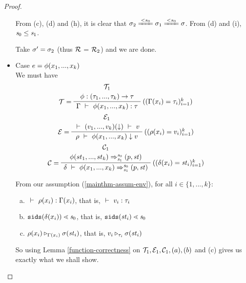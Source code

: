 \begin{proof}
\begin{itemize}
 From (c), (d) and (h), it is clear that $\sgm_2 \ConEq{s_0} \sgm_1 \ConEq{s_0} \sgm$.
 From (d) and (i), $\mathit{s}_0 \le \mathit{s}_1$.
 
 Take $\sigma' = \sigma_2$ (thus $\mathcal{R}$ = $\mathcal{R}_2$)  and we are done. 
 
 
 \item Case $e = \phi(x_1,...,x_k)$ \\
 We must have  
 $$\PT{
 	\UCN{\MT_1}{\Typef {\hcall} {\replc{k}{\tau}} {\tau}}
 	\LeLa{\MT = }
 	\RiLa{((\Gam(x_i)= \tau_i)^k_{i=1})}
 	\UC{\Type{\Gam}{\hcall{\Tupk{x}}}{\tau}}
 }$$
 $$\PT{
 	\UCN{\ME_1}{\Eval{}{\EvalF{\Tupk{v}}}{v}}
 	\LeLa{\ME = }
 	\RiLa{((\rho(x_i)=v_i)^k_{i=1})}
 	\UC{\Eval{\rho}{\hcall{\Tupk{x}}}{v}}
 }$$
 $$\PT{
 	\UCN{\MC_1}{\Transf{\hcall}{\replc{k}{st}}{\s_0}{\s_1}{\sfun{p}{\st}}}
    \LeLa{\MC =}
 	\RiLa{((\del(x_i)=\st_i)^k_{i=1})}
 	\UC{\Trans{\del}{\hcall \Tupk{x}}{\s_0}{\s_1}{\sfun{p}{\st}}}
 }$$
 
 From our assumption (\ref{mainthm-assum-env}), for all $i \in \{1,...,k\}$:
 \begin{enumerate}[(a)]
 	\item $\ \vdash\  \rho(x_i) : \Gamma(x_i)$, that is, $\ \vdash\  v_i : \tau_i$
 	\item $\sids{\del(x_i)} \.< \s_0$, that is, $\sids{\st_i} \.< \s_0$
 	\item $\rho(x_i) \triangleright_{\Gamma(x_i)} \sigma(\mathit{st}_i)$, that is,
 	$v_i \triangleright_{\tau_i} \sigma(\mathit{st}_i)$
 \end{enumerate}
 
 So using Lemma \ref{function-correctness} on $\mathcal{T}_1,\mathcal{E}_1, \mathcal{C}_1, (a),(b)$ and (c) gives us exactly what we shall show.
 	
	\end{itemize}	
\end{proof}


